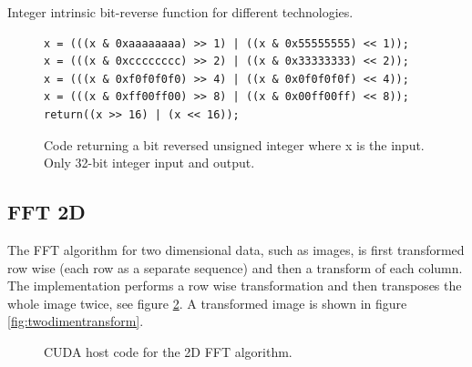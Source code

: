 \begin{table}[h!]
	\centering
	
	\caption{Integer intrinsic bit-reverse function for different technologies.}
	\label{tab:bit-reverse-intrinsics}
\end{table}

\begin{figure}[h]
	\centering
	\lstset{language=C++}
	\begin{framed}
	\begin{lstlisting}
x = (((x & 0xaaaaaaaa) >> 1) | ((x & 0x55555555) << 1));
x = (((x & 0xcccccccc) >> 2) | ((x & 0x33333333) << 2));
x = (((x & 0xf0f0f0f0) >> 4) | ((x & 0x0f0f0f0f) << 4));
x = (((x & 0xff00ff00) >> 8) | ((x & 0x00ff00ff) << 8));
return((x >> 16) | (x << 16));
	\end{lstlisting}
	\end{framed}
	\caption{ Code returning a bit reversed unsigned integer where x is the input. Only 32-bit integer input and output. }
	\label{fig:code-bit-reverse}
\end{figure}

\subsection{FFT 2D}

The FFT algorithm for two dimensional data, such as images, is first transformed row wise (each row as a separate sequence) and then a transform of each column. The implementation performs a row wise transformation and then transposes the whole image twice, see figure \ref{lst:cuda:host-2d-example}. A transformed image is shown in figure \ref{fig:twodimentransform}.

\begin{figure}[h!]
	\centering
	\begin{framed}
			
	\end{framed}
	\caption{CUDA host code for the 2D FFT algorithm.}
	\label{lst:cuda:host-2d-example}	
\end{figure}

